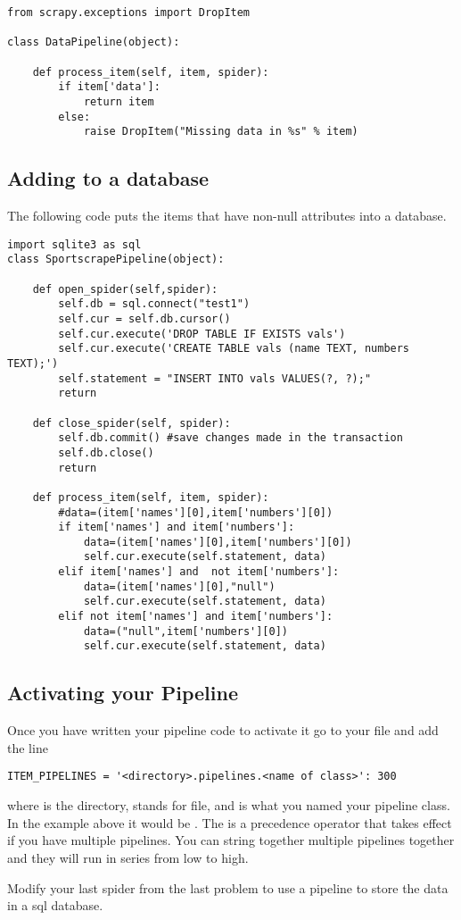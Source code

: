 \begin{lstlisting}
from scrapy.exceptions import DropItem

class DataPipeline(object):

    def process_item(self, item, spider):
        if item['data']:
            return item
        else:
            raise DropItem("Missing data in %s" % item)
\end{lstlisting}

\subsection*{Adding to a database}
The following code puts the items that have non-null attributes into a database. 
\begin{lstlisting}
import sqlite3 as sql
class SportscrapePipeline(object):
	
	def open_spider(self,spider):
		self.db = sql.connect("test1")
		self.cur = self.db.cursor()
		self.cur.execute('DROP TABLE IF EXISTS vals')
		self.cur.execute('CREATE TABLE vals (name TEXT, numbers TEXT);')
		self.statement = "INSERT INTO vals VALUES(?, ?);"
		return

	def close_spider(self, spider):
		self.db.commit() #save changes made in the transaction
		self.db.close()
		return

	def process_item(self, item, spider):
		#data=(item['names'][0],item['numbers'][0])
		if item['names'] and item['numbers']:
			data=(item['names'][0],item['numbers'][0])
			self.cur.execute(self.statement, data)
		elif item['names'] and  not item['numbers']:
			data=(item['names'][0],"null")
			self.cur.execute(self.statement, data)
		elif not item['names'] and item['numbers']:
			data=("null",item['numbers'][0])
			self.cur.execute(self.statement, data)
\end{lstlisting}

\subsection*{Activating your Pipeline}
Once you have written your pipeline code to activate it go to your  file and add the line
\begin{lstlisting}
ITEM_PIPELINES = '<directory>.pipelines.<name of class>': 300
\end{lstlisting}
where  is the directory,  stands for  file, and  is what you named your pipeline class. In the example above it would be . The  is a precedence operator that takes effect if you have multiple pipelines. You can string together multiple pipelines together and they will run in series from low to high.

\begin{problem}
Modify your last spider from the last problem to use a pipeline to store the data in a sql database.
\end{problem}

